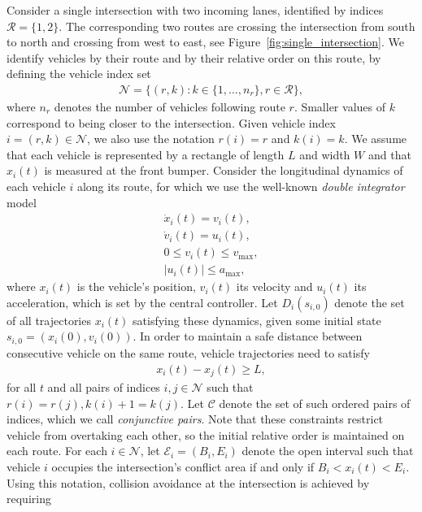 \documentclass{article}
\theoremstyle{definition}
\theoremstyle{plain}
\begin{document}
Consider a single intersection with two incoming lanes, identified by indices
$\mathcal{R} = \{ 1, 2 \}$. The corresponding two routes are crossing the
intersection from south to north and crossing from west to east, see
Figure~\ref{fig:single_intersection}. We identify vehicles by their route and by
their relative order on this route, by defining the vehicle index set
\begin{align*}
  \mathcal{N} = \{ (r, k) : k \in \{1, \dots, n_{r}\}, r \in \mathcal{R}\} ,
\end{align*}
where $n_{r}$ denotes the number of vehicles following route $r$. Smaller values
of $k$ correspond to being closer to the intersection. Given vehicle index
$i = (r, k) \in \mathcal{N}$, we also use the notation $r(i) = r$ and $k(i) = k$.
%
We assume that each vehicle is represented by a rectangle of length $L$ and
width $W$ and that $x_{i}(t)$ is measured at the front bumper.
%
Consider the longitudinal dynamics of each vehicle $i$ along its route, for
which we use the well-known \textit{double integrator} model
\begin{align*}
  \dot{x}_{i}(t) = v_{i}(t) , \\
  \dot{v}_{i}(t) = u_{i}(t)  , \\
  0 \leq v_{i}(t) \leq v_{\max} , \\
  |u_{i}(t) | \leq a_{\max} ,
\end{align*}
where $x_{i}(t)$ is the vehicle's position, $v_{i}(t)$ its velocity and
$u_{i}(t)$ its acceleration, which is set by the central controller. Let
$D_{i}(s_{i,0})$ denote the set of all trajectories $x_{i}(t)$ satisfying these
dynamics, given some initial state $s_{i,0} = (x_{i}(0), v_{i}(0))$.
%
In order to
maintain a safe distance between consecutive vehicle on the same route, vehicle
trajectories need to satisfy
\begin{align*}
  x_{i}(t) - x_{j}(t) \geq L ,
\end{align*}
for all $t$ and all pairs of indices $i, j \in \mathcal{N}$ such that
$r(i) = r(j), k(i) + 1 = k(j)$. Let $\mathcal{C}$ denote the set of such ordered
pairs of indices, which we call \textit{conjunctive pairs}. Note that these
constraints restrict vehicle from overtaking each other, so the initial relative
order is maintained on each route.
%
For each $i \in \mathcal{N}$, let $\mathcal{E}_{i} = (B_{i}, E_{i})$ denote the
open interval such that vehicle $i$ occupies the intersection's conflict area if
and only if $B_{i} < x_{i}(t) < E_{i}$. Using this notation, collision avoidance
at the intersection is achieved by requiring
\end{document}
